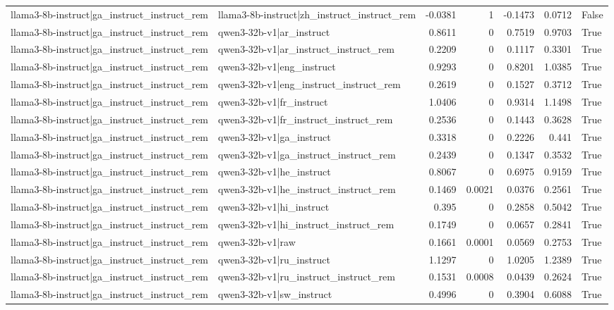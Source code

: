 \begin{table}
\begin{tabular}{l l r r r r l}
llama3-8b-instruct|ga_instruct_instruct_rem & llama3-8b-instruct|zh_instruct_instruct_rem & -0.0381 & 1 & -0.1473 & 0.0712 & False \\
llama3-8b-instruct|ga_instruct_instruct_rem & qwen3-32b-v1|ar_instruct & 0.8611 & 0 & 0.7519 & 0.9703 & True \\
llama3-8b-instruct|ga_instruct_instruct_rem & qwen3-32b-v1|ar_instruct_instruct_rem & 0.2209 & 0 & 0.1117 & 0.3301 & True \\
llama3-8b-instruct|ga_instruct_instruct_rem & qwen3-32b-v1|eng_instruct & 0.9293 & 0 & 0.8201 & 1.0385 & True \\
llama3-8b-instruct|ga_instruct_instruct_rem & qwen3-32b-v1|eng_instruct_instruct_rem & 0.2619 & 0 & 0.1527 & 0.3712 & True \\
llama3-8b-instruct|ga_instruct_instruct_rem & qwen3-32b-v1|fr_instruct & 1.0406 & 0 & 0.9314 & 1.1498 & True \\
llama3-8b-instruct|ga_instruct_instruct_rem & qwen3-32b-v1|fr_instruct_instruct_rem & 0.2536 & 0 & 0.1443 & 0.3628 & True \\
llama3-8b-instruct|ga_instruct_instruct_rem & qwen3-32b-v1|ga_instruct & 0.3318 & 0 & 0.2226 & 0.441 & True \\
llama3-8b-instruct|ga_instruct_instruct_rem & qwen3-32b-v1|ga_instruct_instruct_rem & 0.2439 & 0 & 0.1347 & 0.3532 & True \\
llama3-8b-instruct|ga_instruct_instruct_rem & qwen3-32b-v1|he_instruct & 0.8067 & 0 & 0.6975 & 0.9159 & True \\
llama3-8b-instruct|ga_instruct_instruct_rem & qwen3-32b-v1|he_instruct_instruct_rem & 0.1469 & 0.0021 & 0.0376 & 0.2561 & True \\
llama3-8b-instruct|ga_instruct_instruct_rem & qwen3-32b-v1|hi_instruct & 0.395 & 0 & 0.2858 & 0.5042 & True \\
llama3-8b-instruct|ga_instruct_instruct_rem & qwen3-32b-v1|hi_instruct_instruct_rem & 0.1749 & 0 & 0.0657 & 0.2841 & True \\
llama3-8b-instruct|ga_instruct_instruct_rem & qwen3-32b-v1|raw & 0.1661 & 0.0001 & 0.0569 & 0.2753 & True \\
llama3-8b-instruct|ga_instruct_instruct_rem & qwen3-32b-v1|ru_instruct & 1.1297 & 0 & 1.0205 & 1.2389 & True \\
llama3-8b-instruct|ga_instruct_instruct_rem & qwen3-32b-v1|ru_instruct_instruct_rem & 0.1531 & 0.0008 & 0.0439 & 0.2624 & True \\
llama3-8b-instruct|ga_instruct_instruct_rem & qwen3-32b-v1|sw_instruct & 0.4996 & 0 & 0.3904 & 0.6088 & True \\

\end{tabular}
\end{table}
